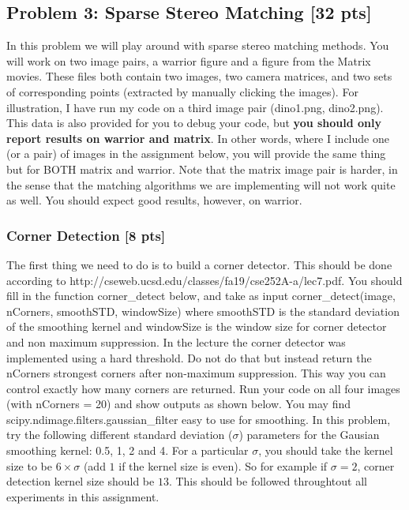 \documentclass[11pt]{article}
\begin{document}
    \hypertarget{problem-3-sparse-stereo-matching-32-pts}{%
\subsection{Problem 3: Sparse Stereo Matching {[}32
pts{]}}\label{problem-3-sparse-stereo-matching-32-pts}}

    In this problem we will play around with sparse stereo matching methods.
You will work on two image pairs, a warrior figure and a figure from the
Matrix movies. These files both contain two images, two camera matrices,
and two sets of corresponding points (extracted by manually clicking the
images). For illustration, I have run my code on a third image pair
(dino1.png, dino2.png). This data is also provided for you to debug your
code, but \textbf{you should only report results on warrior and matrix}.
In other words, where I include one (or a pair) of images in the
assignment below, you will provide the same thing but for BOTH matrix
and warrior. Note that the matrix image pair is harder, in the sense
that the matching algorithms we are implementing will not work quite as
well. You should expect good results, however, on warrior.

    \hypertarget{corner-detection-8-pts}{%
\subsubsection{Corner Detection {[}8
pts{]}}\label{corner-detection-8-pts}}

The first thing we need to do is to build a corner detector. This should
be done according to
http://cseweb.ucsd.edu/classes/fa19/cse252A-a/lec7.pdf. You should fill
in the function corner\_detect below, and take as input
corner\_detect(image, nCorners, smoothSTD, windowSize) where smoothSTD
is the standard deviation of the smoothing kernel and windowSize is the
window size for corner detector and non maximum suppression. In the
lecture the corner detector was implemented using a hard threshold. Do
not do that but instead return the nCorners strongest corners after
non-maximum suppression. This way you can control exactly how many
corners are returned. Run your code on all four images (with nCorners =
20) and show outputs as shown below. You may find
scipy.ndimage.filters.gaussian\_filter easy to use for smoothing. In
this problem, try the following different standard deviation
(\(\sigma\)) parameters for the Gausian smoothing kernel: 0.5, 1, 2 and
4. For a particular \(\sigma\), you should take the kernel size to be
\(6\times\sigma\) (add \(1\) if the kernel size is even). So for example
if \(\sigma=2\), corner detection kernel size should be \(13\). This
should be followed throughtout all experiments in this assignment.
\end{document}
